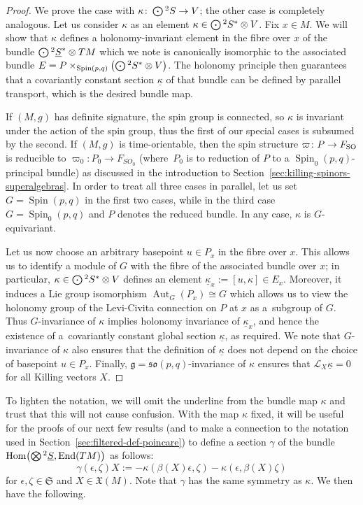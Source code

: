 \documentclass[10pt,a4paper]{amsart}
\numberwithin{equation}{section}
\newcommand{\fg}{\mathfrak{g}}
\newcommand{\fso}{\mathfrak{so}}
\newcommand{\fX}{\mathfrak{X}}
\newcommand{\fS}{\mathfrak{S}}
\newcommand{\eL}{\mathscr{L}}
\newcommand{\Sbundle}{\underline{S}}
\newcommand{\Odot}{\mathchoice{{\textstyle\bigodot}}{\bigodot}{\bigodot}{\bigodot}}
\newcommand{\Otimes}{\mathchoice{{\textstyle\bigotimes}}{\bigotimes}{\bigotimes}{\bigotimes}}
\newcommand{\1}{\mathbbm{1}}
\DeclareMathOperator{\End}{End}
\DeclareMathOperator{\Hom}{Hom}
\DeclareMathOperator{\Spin}{Spin}
\DeclareMathOperator{\Aut}{Aut}
\begin{document}
\begin{proof}
	We prove the case with $\kappa\colon \Odot^2S\to V$; the other case is completely analogous. Let us consider $\kappa$ as an element $\kappa\in\Odot^2S^*\otimes V$. Fix $x\in M$. We will show that $\kappa$ defines a holonomy-invariant element in the fibre over $x$ of the bundle $\Odot^2\Sbundle^*\otimes TM$ which we note is canonically isomorphic to the associated bundle $E=P\times_{\Spin(p,q)}\bigl(\Odot^2S^*\otimes V\bigr)$. The holonomy principle then guarantees that a covariantly constant section $\underline\kappa$ of that bundle can be defined by parallel transport, which is the desired bundle map.
	
	If $(M,g)$ has definite signature, the spin group is connected, so $\kappa$ is invariant under the action of the spin group, thus the first of our special cases is subsumed by the second. If $(M,g)$ is time-orientable, then the spin structure $\varpi\colon P\to F_{\rm SO}$ is reducible to $\varpi_0\colon P_0\to F_{SO_0}$ (where~$P_0$ is to reduction of $P$ to a $\Spin_0(p,q)$-principal bundle) as discussed in the introduction to Section~\ref{sec:killing-spinors-superalgebras}. In order to treat all three cases in parallel, let us set $G=\Spin(p,q)$ in the first two cases, while in the third case $G=\Spin_0(p,q)$ and $P$ denotes the reduced bundle. In any case, $\kappa$ is $G$-equivariant.
	
	Let us now choose an arbitrary basepoint $u\in P_x$ in the fibre over $x$. This allows us to identify a module of $G$ with the fibre of the associated bundle over $x$; in particular, $\kappa\in\Odot^2S^*\otimes V$ defines an element $\underline\kappa_x:=[u,\kappa]\in E_x$. Moreover, it induces a Lie group isomorphism $\Aut_G(P_x)\cong G$ which allows us to view the holonomy group of the Levi-Civita connection on $P$ at $x$ as a~subgroup of $G$. Thus $G$-invariance of $\kappa$ implies holonomy invariance of $\underline\kappa_x$, and hence the existence of a~covariantly constant global section $\underline\kappa$, as required. We note that $G$-invariance of $\kappa$ also ensures that the definition of $\underline\kappa$ does not depend on the choice of basepoint $u\in P_x$. Finally, $\fg=\fso(p,q)$-invariance of $\kappa$ ensures that $\eL_X\underline\kappa=0$ for all Killing vectors $X$.
\end{proof}

To lighten the notation, we will omit the underline from the bundle map $\kappa$ and trust that this will not cause confusion. With the map $\kappa$ fixed, it will be useful for the proofs of our next few results (and to make a connection to the notation used in Section~\ref{sec:filtered-def-poincare}) to define a section $\gamma$ of the bundle $\Hom\bigl(\Otimes^2\Sbundle,\End(TM)\bigr)$ as follows:
\begin{equation}\label{eq:gamma-geom-def}
	\gamma(\epsilon,\zeta)X := - \kappa(\beta(X)\epsilon,\zeta) - \kappa(\epsilon,\beta(X)\zeta)
\end{equation}
for $\epsilon,\zeta\in\fS$ and $X\in\fX(M)$. Note that $\gamma$ has the same symmetry as $\kappa$. We then have the following.
\end{document}
